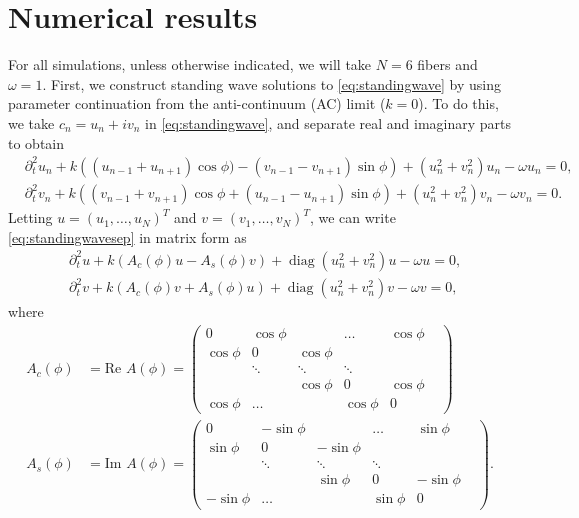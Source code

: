 \documentclass[11pt,reqno]{amsart}
\DeclareMathOperator{\diag}{diag}
\begin{document}
\section{Numerical results}\label{sec:numerics}

For all simulations, unless otherwise indicated, we will take $N=6$ fibers and $\omega=1$. First, we construct standing wave solutions to \cref{eq:standingwave} by using parameter continuation from the anti-continuum (AC) limit ($k=0$). To do this, we take $c_n = u_n + i v_n$ in \cref{eq:standingwave}, and separate real and imaginary parts to obtain
\begin{equation}\label{eq:standingwavesep}
\begin{aligned}
&\partial_t^2 u_n + k\left( (u_{n-1} + u_{n+1}) \cos \phi ) - (v_{n-1} - v_{n+1})\sin \phi \right) + (u_n^2+v_n^2) u_n - \omega u_n= 0, \\
&\partial_t^2 v_n + k\left( (v_{n-1} + v_{n+1} ) \cos \phi + (u_{n-1}- u_{n+1})\sin \phi \right) +(u_n^2+v_n^2) v_n - \omega v_n = 0.
\end{aligned}
\end{equation}
Letting $u = (u_1, \dots, u_N)^T$ and $v = (v_1, \dots, v_N)^T$, we can write \cref{eq:standingwavesep} in matrix form as 
\begin{equation}\label{eq:standingwavematrixsep}
\begin{aligned}
&\partial_t^2 u + k (A_c(\phi) u - A_s(\phi) v) + \diag\left(u_n^2 + v_n^2 \right)u - \omega u = 0, \\
&\partial_t^2 v + k (A_c(\phi) v + A_s(\phi) u) + \diag\left(u_n^2 + v_n^2 \right)v - \omega v = 0,
\end{aligned}
\end{equation}
where
\begin{align*}
A_c(\phi) &= \text{Re } A(\phi) = \begin{pmatrix}
0 & \cos \phi & & \dots & \cos \phi \\
\cos \phi & 0 & \cos \phi & & & \\
& \ddots & \ddots & \ddots &  & \\
 & &\cos \phi  & 0 & \cos \phi  \\
\cos \phi& \dots & & \cos \phi & 0
\end{pmatrix} \\
A_s(\phi) &= \text{Im } A(\phi) = \begin{pmatrix}
0 & -\sin \phi & & \dots & \sin \phi \\
\sin \phi & 0 & -\sin \phi & & & \\
& \ddots & \ddots & \ddots &  & \\
 & &\sin \phi  & 0 & -\sin \phi  \\
-\sin \phi& \dots & & \sin \phi & 0
\end{pmatrix}.
\end{align*}
\end{document}
